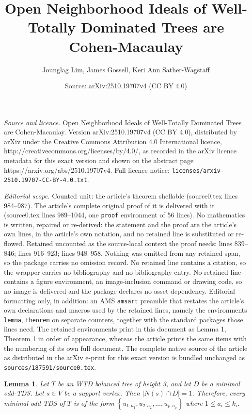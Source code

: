 \documentclass[10pt,a4paper]{amsart}
\title{Open Neighborhood Ideals of Well-Totally Dominated Trees are Cohen-Macaulay}
\author{Jounglag Lim, James Gossell, Keri Ann Sather-Wagstaff}
\date{Source: arXiv:2510.19707v4 (CC BY 4.0)}
\newtheorem{lemma}{Lemma}
\newcommand\set[1]{\left\lbrace #1 \right\rbrace}
\begin{document}
\maketitle

\noindent\emph{Source and licence.} Open Neighborhood Ideals of Well-Totally Dominated Trees are Cohen-Macaulay. Version arXiv:2510.19707v4 (CC BY 4.0), distributed by arXiv under the Creative Commons Attribution 4.0 International licence, http://creativecommons.org/licenses/by/4.0/, as recorded in the arXiv licence metadata for this exact version and shown on the abstract page https://arxiv.org/abs/2510.19707v4. Full licence notice: \texttt{licenses/arxiv-2510.19707-CC-BY-4.0.txt}.\par\smallskip

\noindent\textit{Editorial scope.} Counted unit: the article's theorem shellable (source0.tex lines 984--987). The article's complete original proof of it is delivered with it (source0.tex lines 989--1044, one \texttt{proof} environment of 56 lines). No mathematics is written, repaired or re-derived: the statement and the proof are the article's own lines, in the article's own notation, and no retained line is substituted or re-flowed.  Retained uncounted as the source-local context the proof needs: lines 839--846; lines 916--923; lines 948--958.  Nothing was omitted from any retained span, so the package carries no omission record.  No retained line contains a citation, so the wrapper carries no bibliography and no bibliography entry.  No retained line contains a figure environment, an image-inclusion command or drawing code, so no image is delivered and the package declares no asset dependency.  Editorial formatting only, in addition: an AMS \texttt{amsart} preamble that restates the article's own declarations and macros used by the retained lines, namely the environments \texttt{lemma}, \texttt{theorem} on separate counters, together with the standard packages those lines need.  The retained environments print in this document as Lemma 1, Theorem 1 in order of appearance, whereas the article prints the same items with the numbering of its own full document.  The complete native source of the article as distributed in the arXiv e-print for this exact version is bundled unchanged as \texttt{sources/187591/source0.tex}.
\begin{lemma}\label{lem. |N(s) cap D| = 1}
    Let $T$ be an WTD balanced tree of height 3, and let $D$ be a minimal odd-TDS.
    Let $s \in V$ be a support vertex.
    Then $|N(s) \cap D| = 1$.
    Therefore, every minimal odd-TDS of $T$ is of the form
    $\set{u_{1,a_1},u_{2,a_2},\dots,u_{p,a_{p}}}$
where $1 \leq a_i \leq k_i$.
\end{lemma}
\end{document}
